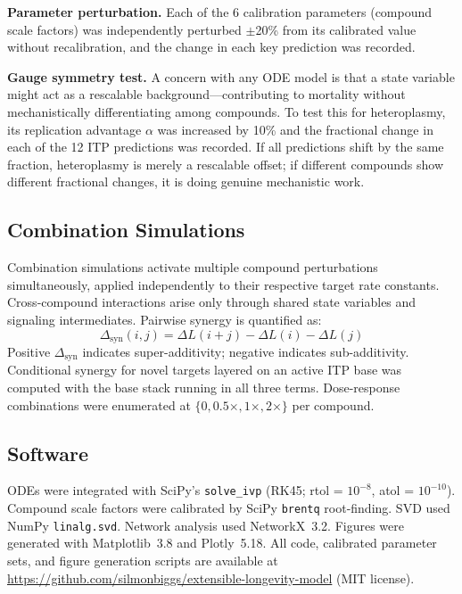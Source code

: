 \documentclass[11pt]{article}
\begin{document}
\textbf{Parameter perturbation.} Each of the 6 calibration parameters (compound scale factors) was independently perturbed $\pm$20\% from its calibrated value without recalibration, and the change in each key prediction was recorded.

\textbf{Gauge symmetry test.} A concern with any ODE model is that a state variable might act as a rescalable background---contributing to mortality without mechanistically differentiating among compounds. To test this for heteroplasmy, its replication advantage $\alpha$ was increased by 10\% and the fractional change in each of the 12 ITP predictions was recorded. If all predictions shift by the same fraction, heteroplasmy is merely a rescalable offset; if different compounds show different fractional changes, it is doing genuine mechanistic work.

\subsection{Combination Simulations}

Combination simulations activate multiple compound perturbations simultaneously, applied independently to their respective target rate constants. Cross-compound interactions arise only through shared state variables and signaling intermediates. Pairwise synergy is quantified as:
\begin{equation}
\Delta_{\text{syn}}(i,j) = \Delta L(i+j) - \Delta L(i) - \Delta L(j)
\end{equation}
Positive $\Delta_{\text{syn}}$ indicates super-additivity; negative indicates sub-additivity. Conditional synergy for novel targets layered on an active ITP base was computed with the base stack running in all three terms. Dose-response combinations were enumerated at $\{0, 0.5\times, 1\times, 2\times\}$ per compound.

\subsection{Software}

ODEs were integrated with SciPy's \texttt{solve\_ivp} (RK45; rtol = $10^{-8}$, atol = $10^{-10}$). Compound scale factors were calibrated by SciPy \texttt{brentq} root-finding. SVD used NumPy \texttt{linalg.svd}. Network analysis used NetworkX~3.2. Figures were generated with Matplotlib~3.8 and Plotly~5.18. All code, calibrated parameter sets, and figure generation scripts are available at \url{https://github.com/silmonbiggs/extensible-longevity-model} (MIT license).
\end{document}

